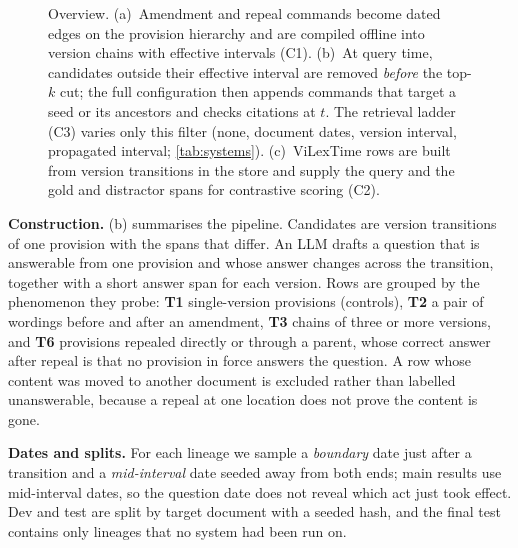 \documentclass[conference]{IEEEtran}
\begin{document}
\begin{figure}[t]
\caption{Overview. (a)~Amendment and repeal commands become dated edges on the provision hierarchy and are compiled offline into version chains with effective intervals (C1). (b)~At query time, candidates outside their effective interval are removed \emph{before} the top-$k$ cut; the full configuration then appends commands that target a seed or its ancestors and checks citations at $t$. The retrieval ladder (C3) varies only this filter (none, document dates, version interval, propagated interval; \cref{tab:systems}). (c)~ViLexTime rows are built from version transitions in the store and supply the query and the gold and distractor spans for contrastive scoring (C2).}
\label{fig:overview}
\end{figure}

\textbf{Construction.} (b) summarises the pipeline. Candidates are version transitions of one provision with the spans that differ. An LLM drafts a question that is answerable from one provision and whose answer changes across the transition, together with a short answer span for each version. Rows are grouped by the phenomenon they probe: \textbf{T1} single-version provisions (controls), \textbf{T2} a pair of wordings before and after an amendment, \textbf{T3} chains of three or more versions, and \textbf{T6} provisions repealed directly or through a parent, whose correct answer after repeal is that no provision in force answers the question. A row whose content was moved to another document is excluded rather than labelled unanswerable, because a repeal at one location does not prove the content is gone.

\textbf{Dates and splits.} For each lineage we sample a \emph{boundary} date just after a transition and a \emph{mid-interval} date seeded away from both ends; main results use mid-interval dates, so the question date does not reveal which act just took effect. Dev and test are split by target document with a seeded hash, and the final test contains only lineages that no system had been run on.
\end{document}

